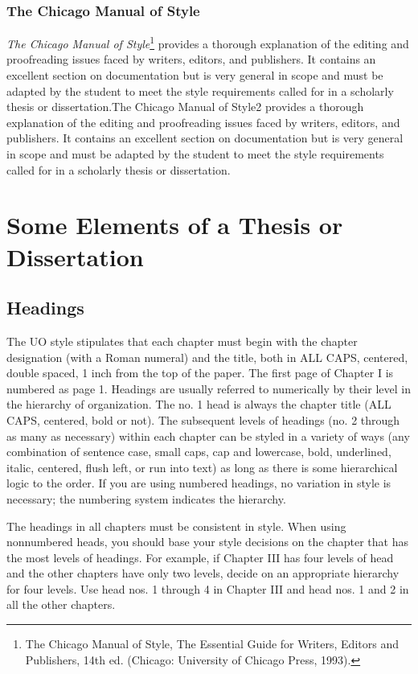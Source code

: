 \subsubsection{The Chicago Manual of Style}

\emph{The Chicago Manual of Style}\footnote{The Chicago Manual of Style, The Essential Guide for Writers, Editors and Publishers,
14th ed. (Chicago: University of Chicago Press, 1993).
} provides a thorough explanation of the editing and proofreading issues faced by writers, editors, and publishers. It contains an excellent section on documentation but is very general in scope and must be adapted by the student to meet the style requirements called for in a scholarly thesis or dissertation.The Chicago Manual of Style2 provides a thorough explanation of the editing and proofreading issues faced by writers, editors, and publishers. It contains an excellent section on documentation but is very general in scope and must be adapted by the student to meet the style requirements called for in a scholarly thesis or dissertation.

\section{Some Elements of a Thesis or Dissertation}

\subsection{Headings}

The UO style stipulates that each chapter must begin with the chapter designation
(with a Roman numeral) and the title, both in ALL CAPS, centered, double spaced, 1 inch from the top of the paper. The first page of Chapter I is numbered as page 1. Headings are usually referred to numerically by their level in the hierarchy of organization. The no. 1 head is always the chapter title (ALL CAPS, centered, bold or not). The subsequent levels of headings (no. 2 through as many as necessary) within each chapter can be styled in a variety of ways (any combination of sentence case, small caps, cap and lowercase, bold, underlined, italic, centered, flush left, or run into text) as long as there is some hierarchical logic to the order. If you are using numbered headings, no variation in style is necessary; the numbering system indicates the hierarchy.

The headings in all chapters must be consistent in style. When using nonnumbered heads, you should base your style decisions on the chapter that has the most levels of headings. For example, if Chapter III has four levels of head and the other chapters have only two levels, decide on an appropriate hierarchy for four levels. Use head nos. 1 through 4 in Chapter III and head nos. 1 and 2 in all the other chapters.

